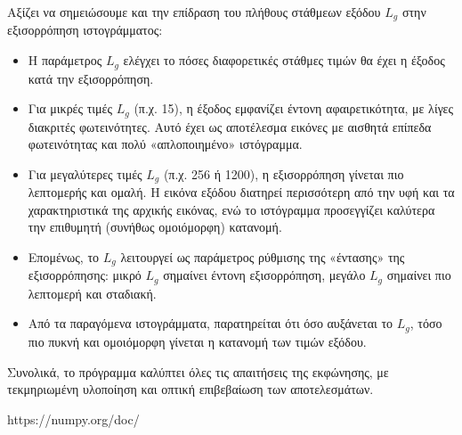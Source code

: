 \documentclass[a4paper,12pt]{report}
\newcommand{\en}{\selectlanguage{english}}
\begin{document}
\vspace{0.3cm}

\hspace{-0.6cm}Aξίζει να σημειώσουμε και την επίδραση του πλήθους στάθμεων εξόδου $L_g$ στην εξισορρόπηση ιστογράμματος:

\begin{itemize}
  \item Η παράμετρος $L_g$ ελέγχει το πόσες διαφορετικές στάθμες τιμών θα έχει η έξοδος κατά την εξισορρόπηση.
  \item Για μικρές τιμές $L_g$ (π.χ. 15), η έξοδος εμφανίζει έντονη αφαιρετικότητα, με λίγες διακριτές φωτεινότητες. Αυτό έχει ως αποτέλεσμα εικόνες με αισθητά επίπεδα φωτεινότητας και πολύ «απλοποιημένο» ιστόγραμμα.
  \item Για μεγαλύτερες τιμές $L_g$ (π.χ. 256 ή 1200), η εξισορρόπηση γίνεται πιο λεπτομερής και ομαλή. Η εικόνα εξόδου διατηρεί περισσότερη από την υφή και τα χαρακτηριστικά της αρχικής εικόνας, ενώ το ιστόγραμμα προσεγγίζει καλύτερα την επιθυμητή (συνήθως ομοιόμορφη) κατανομή.
  \item Επομένως, το $L_g$ λειτουργεί ως παράμετρος ρύθμισης της «έντασης» της εξισορρόπησης: μικρό $L_g$ σημαίνει έντονη εξισορρόπηση, μεγάλο $L_g$ σημαίνει πιο λεπτομερή και σταδιακή.
  \item Από τα παραγόμενα ιστογράμματα, παρατηρείται ότι όσο αυξάνεται το $L_g$, τόσο πιο πυκνή και ομοιόμορφη γίνεται η κατανομή των τιμών εξόδου.
\end{itemize}

\hspace{-0.6cm}Συνολικά, το πρόγραμμα καλύπτει όλες τις απαιτήσεις της εκφώνησης, με τεκμηριωμένη υλοποίηση και οπτική επιβεβαίωση των αποτελεσμάτων.


\begin{thebibliography}{1}
    \en https://numpy.org/doc/
\end{thebibliography}
\end{document}
